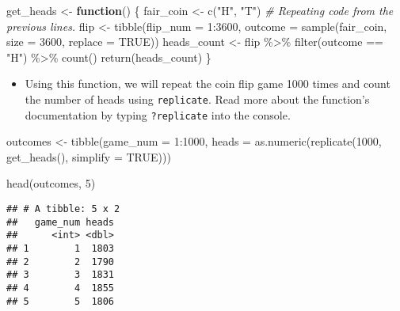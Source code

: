 \documentclass[
]{article}
\newenvironment{Shaded}{\begin{snugshade}}{\end{snugshade}}
\newcommand{\AttributeTok}[1]{\textcolor[rgb]{0.77,0.63,0.00}{#1}}
\newcommand{\CommentTok}[1]{\textcolor[rgb]{0.56,0.35,0.01}{\textit{#1}}}
\newcommand{\ConstantTok}[1]{\textcolor[rgb]{0.00,0.00,0.00}{#1}}
\newcommand{\ControlFlowTok}[1]{\textcolor[rgb]{0.13,0.29,0.53}{\textbf{#1}}}
\newcommand{\DecValTok}[1]{\textcolor[rgb]{0.00,0.00,0.81}{#1}}
\newcommand{\FunctionTok}[1]{\textcolor[rgb]{0.00,0.00,0.00}{#1}}
\newcommand{\NormalTok}[1]{#1}
\newcommand{\OtherTok}[1]{\textcolor[rgb]{0.56,0.35,0.01}{#1}}
\newcommand{\SpecialCharTok}[1]{\textcolor[rgb]{0.00,0.00,0.00}{#1}}
\newcommand{\StringTok}[1]{\textcolor[rgb]{0.31,0.60,0.02}{#1}}
\providecommand{\tightlist}{%
  \setlength{\itemsep}{0pt}\setlength{\parskip}{0pt}}
\begin{document}
\begin{Shaded}
\begin{Highlighting}[]
\NormalTok{get\_heads }\OtherTok{\textless{}{-}} \ControlFlowTok{function}\NormalTok{() \{}
\NormalTok{  fair\_coin }\OtherTok{\textless{}{-}} \FunctionTok{c}\NormalTok{(}\StringTok{"H"}\NormalTok{, }\StringTok{"T"}\NormalTok{) }\CommentTok{\# Repeating code from the previous lines.}
\NormalTok{  flip }\OtherTok{\textless{}{-}} \FunctionTok{tibble}\NormalTok{(}\AttributeTok{flip\_num =} \DecValTok{1}\SpecialCharTok{:}\DecValTok{3600}\NormalTok{, }
                 \AttributeTok{outcome =} \FunctionTok{sample}\NormalTok{(fair\_coin, }\AttributeTok{size =} \DecValTok{3600}\NormalTok{, }\AttributeTok{replace =} \ConstantTok{TRUE}\NormalTok{))}
\NormalTok{  heads\_count }\OtherTok{\textless{}{-}}\NormalTok{ flip }\SpecialCharTok{\%\textgreater{}\%} \FunctionTok{filter}\NormalTok{(outcome }\SpecialCharTok{==} \StringTok{"H"}\NormalTok{) }\SpecialCharTok{\%\textgreater{}\%} \FunctionTok{count}\NormalTok{()}
  \FunctionTok{return}\NormalTok{(heads\_count)}
\NormalTok{\}}
\end{Highlighting}
\end{Shaded}

\begin{itemize}
\tightlist
\item
  Using this function, we will repeat the coin flip game 1000 times and count the number of heads using \texttt{replicate}. Read more about the function's documentation by typing \texttt{?replicate} into the console.
\end{itemize}

\begin{Shaded}
\begin{Highlighting}[]
\NormalTok{outcomes }\OtherTok{\textless{}{-}} \FunctionTok{tibble}\NormalTok{(}\AttributeTok{game\_num =} \DecValTok{1}\SpecialCharTok{:}\DecValTok{1000}\NormalTok{,}
                   \AttributeTok{heads =} \FunctionTok{as.numeric}\NormalTok{(}\FunctionTok{replicate}\NormalTok{(}\DecValTok{1000}\NormalTok{, }\FunctionTok{get\_heads}\NormalTok{(), }\AttributeTok{simplify =} \ConstantTok{TRUE}\NormalTok{))) }

\FunctionTok{head}\NormalTok{(outcomes, }\DecValTok{5}\NormalTok{)}
\end{Highlighting}
\end{Shaded}

\begin{verbatim}
## # A tibble: 5 x 2
##   game_num heads
##      <int> <dbl>
## 1        1  1803
## 2        2  1790
## 3        3  1831
## 4        4  1855
## 5        5  1806
\end{verbatim}
\end{document}
